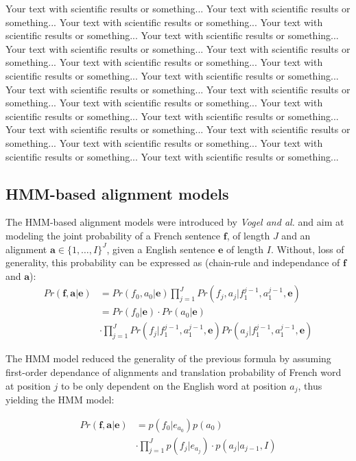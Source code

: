 \documentclass[final]{beamer}
\begin{document}
\begin{frame}[t]
\begin{multicols}{3}
Your text with scientific results or something... 
Your text with scientific results or something... 
Your text with scientific results or something... 
Your text with scientific results or something... 
Your text with scientific results or something... 
Your text with scientific results or something... 
Your text with scientific results or something... 
Your text with scientific results or something... 
Your text with scientific results or something... 
Your text with scientific results or something... 
Your text with scientific results or something... 
Your text with scientific results or something... 
Your text with scientific results or something... 
Your text with scientific results or something... 
Your text with scientific results or something... 
Your text with scientific results or something... 
Your text with scientific results or something... 
Your text with scientific results or something... 
Your text with scientific results or something... 
Your text with scientific results or something... 


\subsection{HMM-based alignment models}

The HMM-based alignment models were introduced by \textit{Vogel and al.} and aim at modeling the joint probability of a French sentence $\textbf{f}$, of length $J$ and an alignment $\textbf{a}\in \{1,\dots,I\}^J$, given a English sentence $\textbf{e}$ of length $I$.
Without, loss of generality, this probability can be expressed as (chain-rule and independance of $\textbf{f}$ and $\textbf{a}$):
\begin{align*}
Pr(\textbf{f},\textbf{a}|\textbf{e}) &= Pr(f_0,a_0|\textbf{e}) \prod_{j=1}^J Pr(f_j,a_j|f_{1}^{j-1},a_{1}^{j-1},\textbf{e})\\
&= Pr(f_0|\textbf{e}) \cdot Pr(a_0|\textbf{e})\\
&\cdot \prod_{j=1}^J Pr(f_j|f_{1}^{j-1},a_{1}^{j-1},\textbf{e}) Pr(a_j|f_{1}^{j-1},a_{1}^{j-1},\textbf{e})
\end{align*}

The HMM model reduced the generality of the previous formula by assuming first-order dependance of alignments and translation probability of French word at position $j$ to be only dependent on the English word at position $a_j$, thus yielding the HMM model:

\begin{align*}
Pr(\textbf{f},\textbf{a}|\textbf{e}) &= p(f_0|e_{a_0}) p(a_0)\\
&\cdot \prod_{j=1}^J p(f_j|e_{a_{j}}) \cdot p(a_j|a_{j-1},I)
\end{align*}


\end{multicols}
\end{frame}
\end{document}
